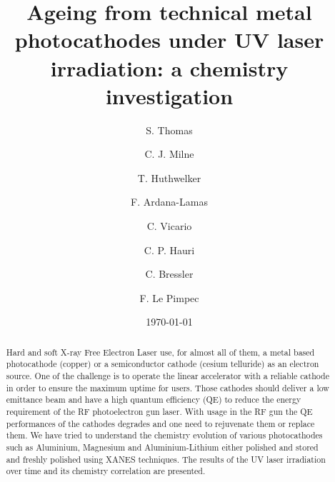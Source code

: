 \documentclass[aip,graphicx]{revtex4-1}
\begin{document}

\title{Ageing from technical metal photocathodes under UV laser irradiation: a chemistry investigation} %



\author{S. Thomas}
\author{C. J. Milne}
\author{T. Huthwelker}
\author{F. Ardana-Lamas}
\author{C. Vicario}
\author{C. P. Hauri}
\author{C. Bressler}
\author{F. Le Pimpec}


\date{\today}

\begin{abstract}
Hard and soft X-ray Free Electron Laser use, for almost all of them, a metal based photocathode (copper) or a semiconductor cathode (cesium telluride) as an electron source. One of the challenge is to operate the linear accelerator with a reliable cathode in order to ensure the maximum uptime for users. Those cathodes should deliver a low emittance beam and have a high quantum efficiency (QE) to reduce the energy requirement of the RF photoelectron gun laser. With usage in the RF gun the QE performances of the cathodes degrades and one need to rejuvenate them or replace them. We have tried to understand the chemistry evolution of various photocathodes such as Aluminium, Magnesium and Aluminium-Lithium either polished and stored and freshly polished using XANES techniques. The results of the UV laser irradiation over time and its chemistry correlation are presented.
\end{abstract}
\end{document}
